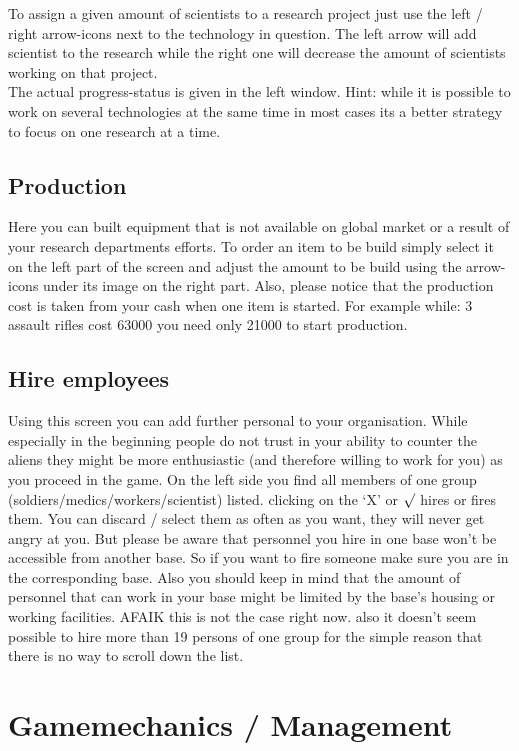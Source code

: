 To assign a given amount of scientists to a research project just use the left / right arrow-icons next to the technology in question. The left arrow will add scientist to the research while the right one will decrease the amount of scientists working on that project.\\
The actual progress-status is given in the left window. Hint: while it is possible to work on several technologies at the same time in most cases its a better strategy to focus on one research at a time.

\subsection{Production}
Here you can built equipment that is not available on global market or a result of your research departments efforts. To order an item to be build simply select it on the left part of the screen and adjust the amount to be build using the arrow-icons under its image on the right part. Also, please notice that the production cost is taken from your cash when one item is started. For example while: 3 assault rifles cost 63000 you need only 21000 to start production.

\subsection{Hire employees}
Using this screen you can add further personal to your organisation. While especially in the beginning people do not trust in your ability to counter the aliens they might be more enthusiastic (and therefore willing to work for you) as you proceed in the game. On the left side you find all members of one group (soldiers/medics/workers/scientist) listed. clicking on the `X' or $\surd$ hires or fires them. You can discard / select them as often as you want, they will never get angry at you. But please be aware that personnel you hire in one base won't be accessible from another base. So if you want to fire someone make sure you are in the corresponding base. Also you should keep in mind that the amount of personnel that can work in your base might be limited by the base's housing or working facilities. AFAIK this is not the case right now. also it doesn't seem possible to hire more than 19 persons of one group for the simple reason that there is no way to scroll down the list.

\section{Gamemechanics / Management}

